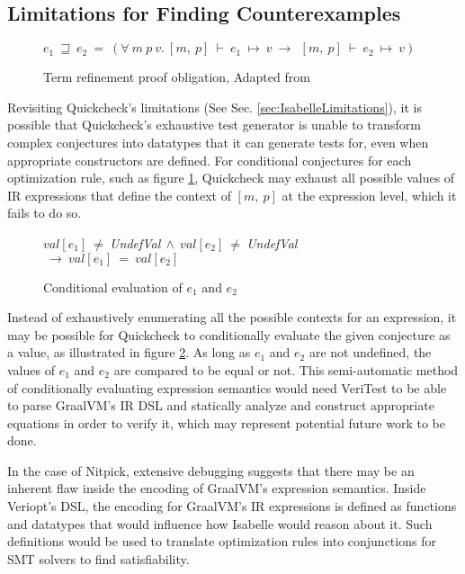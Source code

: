 \subsection{Limitations for Finding Counterexamples}

\begin{figure}[!htb]
    \centering
    \(e_1~\sqsupseteq~e_2~=~(\forall~m~p~v.~[m,~p]~\vdash~e_1~\mapsto~v~\longrightarrow~~[m,~p]~\vdash~e_2~\mapsto~v)\)

    \caption{Term refinement proof obligation, Adapted from \cite[Definition 6]{Term_Graph_Optimizations}}
    \label{fig:RefinementProofObligation}
\end{figure}

Revisiting Quickcheck's limitations (See Sec. \ref{sec:IsabelleLimitations}), it is possible that Quickcheck's exhaustive test generator 
is unable to transform complex conjectures into datatypes that it can generate tests for, even when appropriate constructors are defined. 
For conditional conjectures for each optimization rule, such as figure \ref{fig:RefinementProofObligation}, Quickcheck may exhaust all 
possible values of IR expressions that define the context of \([m,~p]\) at the expression level, which it fails to do so.

\begin{figure}[!htb]
    \centering
    \(val[e_1]~\neq~\)\emph{UndefVal}\(~\land~val[e_2]~\neq~\)\emph{UndefVal}\(~\longrightarrow~val[e_1]~=~val[e_2]\)

    \caption{Conditional evaluation of \(e_1\) and \(e_2\)}
    \label{fig:ConditionalEvaluation}
\end{figure}

Instead of exhaustively enumerating all the possible contexts for an expression, it may be possible for Quickcheck to conditionally evaluate 
the given conjecture as a value, as illustrated in figure \ref{fig:ConditionalEvaluation}. As long as \(e_1\) and \(e_2\) are not undefined, 
the values of \(e_1\) and \(e_2\) are compared to be equal or not. This semi-automatic method of conditionally evaluating expression semantics 
would need VeriTest to be able to parse GraalVM's IR DSL and statically analyze and construct appropriate equations in order to verify it, 
which may represent potential future work to be done.


In the case of Nitpick, extensive debugging suggests that there may be an inherent flaw inside the encoding of GraalVM's expression semantics.
Inside Veriopt's DSL, the encoding for GraalVM's IR expressions is defined as functions and datatypes that would influence how Isabelle would 
reason about it. Such definitions would be used to translate optimization rules into conjunctions for SMT solvers to find satisfiability.

